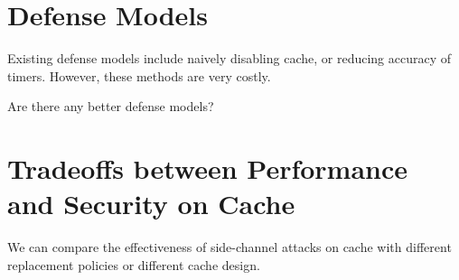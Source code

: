\documentclass{article}
\begin{document}
\section{Defense Models}{
	Existing defense models include naively disabling cache, or reducing accuracy of timers. However, these methods are very costly. 

	Are there any better defense models? 
}

\section{Tradeoffs between Performance and Security on Cache}{
	We can compare the effectiveness of side-channel attacks on cache with different replacement policies or different cache design. 
}
\end{document}

